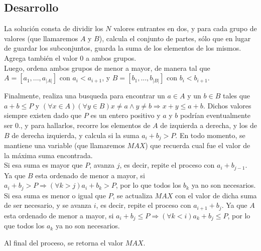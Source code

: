 \subsection{Desarrollo}
La solución consta de dividir los $N$ valores entrantes en dos, y para cada grupo de valores (que llamaremos $A$ y $B$), calcula el conjunto de partes, sólo que en lugar de guardar los subconjuntos, guarda la suma de los elementos de los mismos. Agrega también el valor $0$ a ambos grupos.\\
Luego, ordena ambos grupos de menor a mayor, de manera tal que $A = [a_{1},...,a_{\vert A\vert}]$ con $a_{i} < a_{i+1}$, y $B = [b_{1},...,b_{\vert B\vert}]$ con $b_{i} < b_{i+1}$.\par
Finalmente, realiza una busqueda para encontrar un $a \in A$ y un $b \in B$ tales que $a + b \leq P$ y $(\forall x \in A)(\forall y \in B) x \neq a \wedge y \neq b \Rightarrow x + y \leq a + b$. Dichos valores siempre existen dado que $P$ es un entero positivo y $a$ y $b$ podrían eventualmente ser $0$., y para hallarlos, recorre los elementos de $A$ de izquierda a derecha, y los de $B$ de derecha izquierda, y calcula si la suma $a_{i} + b_{j} > P$. En todo momento, se mantiene una variable (que llamaremos $MAX$) que recuerda cual fue el valor de la máxima suma encontrada.\\
Si esa suma es mayor que $P$, avanza $j$, es decir, repite el proceso con $a_{i} + b_{j-1}$. Ya que $B$ esta ordenado de menor a mayor, si $a_{i} + b_{j} > P \Rightarrow (\forall k > j) a_{i}+b_{k} > P$, por lo que todos los $b_{k}$ ya no son necesarios.\\
Si esa suma es menor o igual que $P$, se actualiza $MAX$ con el valor de dicha suma de ser necesario, y se avanza $i$, es decir, repite el proceso con $a_{i+1} + b_{j}$. Ya que $A$ esta ordenado de menor a mayor, si $a_{i} + b_{j} \leq P \Rightarrow (\forall k < i) a_{k}+b_{j} \leq P$, por lo que todos los $a_{k}$ ya no son necesarios.\par
Al final del proceso, se retorna el valor $MAX$.

